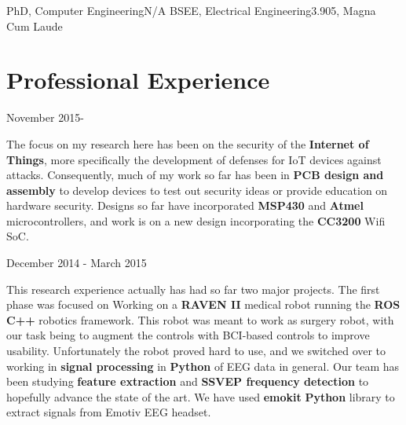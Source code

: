 \documentclass{my_resume}
\begin{document}

    {PhD, Computer Engineering}{N/A}
	{BSEE, Electrical Engineering}{3.905, Magna Cum Laude}

\section{Professional Experience}
    {November 2015-}
\begin{flushleft}
The focus on my research here has been on the security of the \textbf{Internet of Things}, more specifically the development of defenses for IoT devices against attacks.
Consequently, much of my work so far has been in \textbf{PCB design and assembly} to develop devices to test out security ideas or provide education on hardware security. 
Designs so far have incorporated \textbf{MSP430} and \textbf{Atmel} microcontrollers, and work is on a new design incorporating the \textbf{CC3200} Wifi SoC.
\end{flushleft}
	{December 2014 - March 2015}
\begin{flushleft}
This research experience actually has had so far two major projects. The first
phase was focused on Working on a \textbf{RAVEN II} medical robot running the
\textbf{ROS C++} robotics framework. This robot was meant to work as surgery
robot, with our task being to augment the controls with BCI-based controls to
improve usability. Unfortunately the robot proved hard to use, and we switched
over to working in \textbf{signal processing} in \textbf{Python} of EEG data in
general. Our team has been studying \textbf{feature extraction} and
\textbf{SSVEP frequency detection} to hopefully advance the state of the art.
We have used \textbf{emokit} \textbf{Python} library to extract signals from
Emotiv EEG headset.
\end{flushleft}
\end{document}
